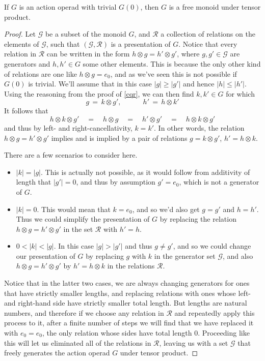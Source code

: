 \documentclass{amsbook} %
\numberwithin{section}{chapter}
\begin{document}
\begin{prop} \label{Gfree} If $G$ is an action operad with trivial $G(0)$, then $G$ is a free monoid under tensor product.
\end{prop}
\begin{proof}
Let $\mathcal{G}$ be a subset of the monoid $G$, and $\mathcal{R}$ a collection of relations on the elements of $\mathcal{G}$, such that $(\mathcal{G},\mathcal{R})$ is a presentation of $G$. Notice that every relation in $\mathcal{R}$ can be written in the form $h \otimes g = h' \otimes g'$, where $g,g' \in \mathcal{G}$ are generators and $h,h' \in G$ some other elements. This is because the only other kind of relations are one like $h \otimes g = e_0$, and as we've seen this is not possible if $G(0)$ is trivial. We'll assume that in this case $|g| \ge |g'|$ and hence $|h| \le |h'|$. Using the reasoning from the proof of \cref{cqr}, we can then find $k, k' \in G$ for which
\[ g \, = \, k \otimes g', \quad \quad \quad h' \, = \, h \otimes k' \]
It follows that
\[ h \otimes k \otimes g' \quad = \quad h \otimes g \quad = \quad h' \otimes g' \quad = \quad h \otimes k \otimes g' \]
and thus by left- and right-cancellativity, $k = k'$.  In other words, the relation $h \otimes g = h' \otimes g'$ implies and is implied by a pair of relations $g = k \otimes g'$, $h' = h \otimes k$. 

There are a few scenarios to consider here. 
\begin{itemize}
\item $|k| = |g|$. This is actually not possible, as it would follow from additivity of length that $|g'|=0$, and thus by assumption $g' = e_0$, which is not a generator of $G$.
\item $|k|=0$. This would mean that $k=e_0$, and so we'd also get $g=g'$ and $h = h'$. Thus we could simplify the presentation of $G$ by replacing the relation $h \otimes g = h' \otimes g'$ in the set $\mathcal{R}$ with $h' = h$.
\item $0 < |k| < |g|$. In this case $|g| > |g'|$ and thus $g \neq g'$, and so we could change our presentation of $G$ by replacing $g$ with $k$ in the generator set $\mathcal{G}$, and also $h \otimes g = h' \otimes g'$ by $h' = h \otimes k$ in the relations $\mathcal{R}$.
\end{itemize}
Notice that in the latter two cases, we are always changing generators for ones that have strictly smaller lengths, and replacing relations with ones whose left- and right-hand side have strictly smaller total length. But lengths are natural numbers, and therefore if we choose any relation in $\mathcal{R}$ and repeatedly apply this process to it, after a finite number of steps we will find that we have replaced it with $e_0 = e_0$, the only relation whose sides have total length $0$. Proceeding like this will let us eliminated all of the relations in $\mathcal{R}$, leaving us with a set $\mathcal{G}$ that freely generates the action operad $G$ under tensor product.
\end{proof} 
\end{document}
